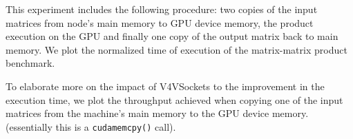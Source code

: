 \documentclass[a0paper,portrait,final]{baposter}
\begin{document}
\begin{poster}
{\begin{multicols}{3}
\hspace{0.5em}
This experiment includes the following procedure: two copies of the input
matrices from node's main memory to GPU device memory, the product execution on
the GPU and finally one copy of the output matrix back to main memory. We plot the
normalized time of execution of the matrix-matrix product benchmark. 


To elaborate more on the impact of V4VSockets to the improvement in the
execution time, we plot the throughput achieved when copying one of the input
matrices from the machine's main memory to the GPU device memory. (essentially
this is a \texttt{cudamemcpy()} call).
\end{multicols}


\vspace{1em}
}

\end{poster}
\end{document}
